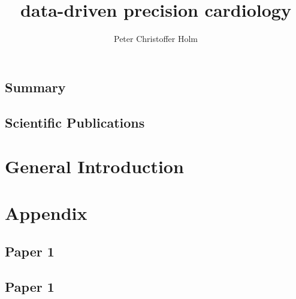\documentclass[%
    a4paper, twoside, dissertation, fontsize=12pt, nobib%
]{tufte-book}
\title{data-driven precision cardiology}
\author[Peter Christoffer Holm]{Peter Christoffer Holm}
\begin{document}
\frontmatter
\maketitle




\cleardoublepage
 
\tableofcontents
\listoffigures
\listoftables
\cleardoublepage


\mainmatter

\chapter{Summary}
\chapter{Scientific Publications}


\part{General Introduction}






\backmatter

\printbibliography


\part*{Appendix}

\appendix

\chapter{Paper 1}
\chapter{Paper 1}


\end{document}
